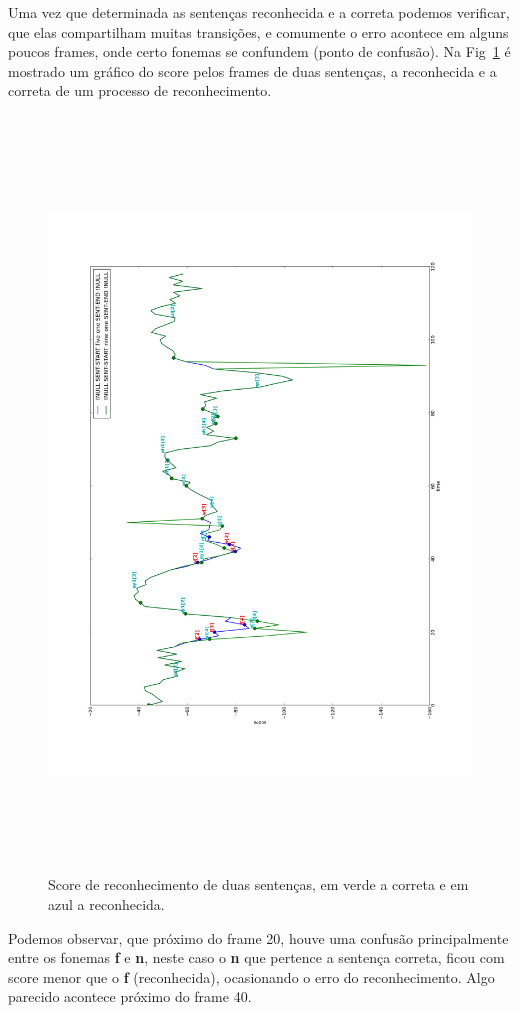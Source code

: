 \documentclass[a4paper]{article}
\begin{document}
Uma vez que determinada as sentenças reconhecida e a correta podemos verificar, que
elas compartilham muitas transições, e comumente o erro acontece em alguns poucos
frames, onde certo fonemas se confundem (ponto de confusão). Na Fig~\ref{fig:score} é mostrado
um gráfico do score pelos frames de duas sentenças, a reconhecida e a correta de um processo
de reconhecimento.

\begin{figure}[!h]
  \includegraphics[height=20cm]{out}
  \caption{Score de reconhecimento de duas sentenças, em verde a correta e em azul a reconhecida.}
  \label{fig:score}
\end{figure}

Podemos observar, que próximo do frame 20, houve uma confusão principalmente entre os fonemas 
\textbf{f} e \textbf{n}, neste caso o \textbf{n} que pertence a sentença correta,
ficou com score menor que o \textbf{f} (reconhecida), ocasionando o erro do reconhecimento. Algo parecido
acontece próximo do frame 40.
\end{document}
